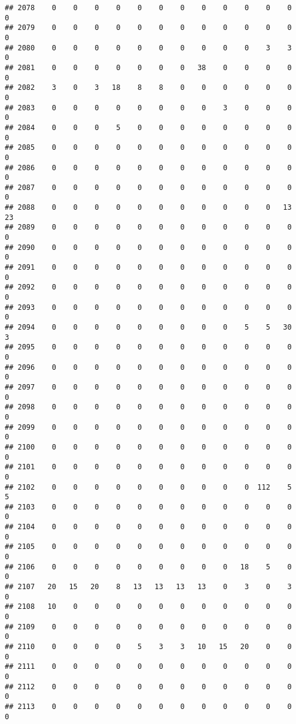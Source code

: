 \documentclass[]{article}
\begin{document}
\begin{verbatim}
## 2078    0    0    0    0    0    0    0    0    0    0    0    0    0
## 2079    0    0    0    0    0    0    0    0    0    0    0    0    0
## 2080    0    0    0    0    0    0    0    0    0    0    3    3    0
## 2081    0    0    0    0    0    0    0   38    0    0    0    0    0
## 2082    3    0    3   18    8    8    0    0    0    0    0    0    0
## 2083    0    0    0    0    0    0    0    0    3    0    0    0    0
## 2084    0    0    0    5    0    0    0    0    0    0    0    0    0
## 2085    0    0    0    0    0    0    0    0    0    0    0    0    0
## 2086    0    0    0    0    0    0    0    0    0    0    0    0    0
## 2087    0    0    0    0    0    0    0    0    0    0    0    0    0
## 2088    0    0    0    0    0    0    0    0    0    0    0   13   23
## 2089    0    0    0    0    0    0    0    0    0    0    0    0    0
## 2090    0    0    0    0    0    0    0    0    0    0    0    0    0
## 2091    0    0    0    0    0    0    0    0    0    0    0    0    0
## 2092    0    0    0    0    0    0    0    0    0    0    0    0    0
## 2093    0    0    0    0    0    0    0    0    0    0    0    0    0
## 2094    0    0    0    0    0    0    0    0    0    5    5   30    3
## 2095    0    0    0    0    0    0    0    0    0    0    0    0    0
## 2096    0    0    0    0    0    0    0    0    0    0    0    0    0
## 2097    0    0    0    0    0    0    0    0    0    0    0    0    0
## 2098    0    0    0    0    0    0    0    0    0    0    0    0    0
## 2099    0    0    0    0    0    0    0    0    0    0    0    0    0
## 2100    0    0    0    0    0    0    0    0    0    0    0    0    0
## 2101    0    0    0    0    0    0    0    0    0    0    0    0    0
## 2102    0    0    0    0    0    0    0    0    0    0  112    5    5
## 2103    0    0    0    0    0    0    0    0    0    0    0    0    0
## 2104    0    0    0    0    0    0    0    0    0    0    0    0    0
## 2105    0    0    0    0    0    0    0    0    0    0    0    0    0
## 2106    0    0    0    0    0    0    0    0    0   18    5    0    0
## 2107   20   15   20    8   13   13   13   13    0    3    0    3    0
## 2108   10    0    0    0    0    0    0    0    0    0    0    0    0
## 2109    0    0    0    0    0    0    0    0    0    0    0    0    0
## 2110    0    0    0    0    5    3    3   10   15   20    0    0    0
## 2111    0    0    0    0    0    0    0    0    0    0    0    0    0
## 2112    0    0    0    0    0    0    0    0    0    0    0    0    0
## 2113    0    0    0    0    0    0    0    0    0    0    0    0    0

\end{verbatim}
\end{document}
